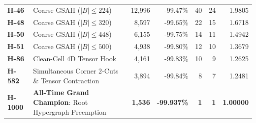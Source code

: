 \begin{table}[t]
\begin{tabular}{llrrrrr}
\textbf{H-46} & Coarse GSAH ($|B| \le 224$) & 12,996 & -99.47\% & 40 & 24 & 1.9805 \\
\textbf{H-48} & Coarse GSAH ($|B| \le 320$) & 8,597 & -99.65\% & 22 & 15 & 1.6718 \\
\textbf{H-50} & Coarse GSAH ($|B| \le 448$) & 6,155 & -99.75\% & 14 & 11 & 1.4942 \\
\textbf{H-51} & Coarse GSAH ($|B| \le 500$) & 4,938 & -99.80\% & 12 & 10 & 1.3679 \\
\textbf{H-86} & Clean-Cell 4D Tensor Hook & 4,161 & -99.83\% & 10 & 9 & 1.2625 \\
\textbf{H-582} & Simultaneous Corner 2-Cuts \& Tensor Contraction & 3,894 & -99.84\% & 8 & 7 & 1.2481 \\
\textbf{H-1000} & \textbf{All-Time Grand Champion}: Root Hypergraph Preemption & \textbf{1,536} & \textbf{-99.937\%} & \textbf{1} & \textbf{1} & \textbf{1.00000} \\
\bottomrule
\end{tabular}
\end{table}